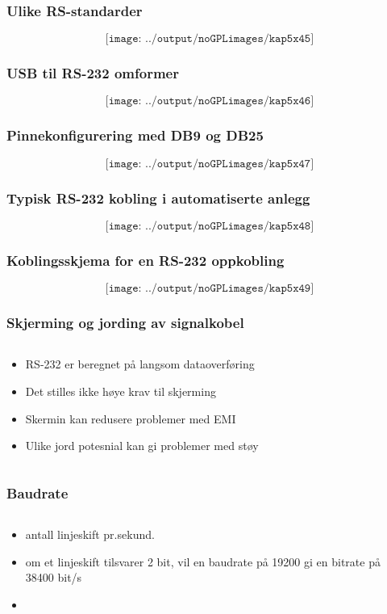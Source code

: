 \documentclass[aspectratio=169,xcolor=dvipsnames]{beamer}
\begin{document}
\begin{frame}
	\frametitle{Ulike RS-standarder}
	$$\texttt{[image: ../output/noGPLimages/kap5x45]}$$
\end{frame}
\begin{frame}
	\frametitle{USB til RS-232 omformer}
	$$\texttt{[image: ../output/noGPLimages/kap5x46]}$$
\end{frame}
\begin{frame}
	\frametitle{Pinnekonfigurering med DB9 og DB25}
	$$\texttt{[image: ../output/noGPLimages/kap5x47]}$$
\end{frame}
\begin{frame}
	\frametitle{Typisk RS-232 kobling i automatiserte anlegg}
	$$\texttt{[image: ../output/noGPLimages/kap5x48]}$$
\end{frame}
\begin{frame}
	\frametitle{Koblingsskjema for en RS-232 oppkobling }
	$$\texttt{[image: ../output/noGPLimages/kap5x49]}$$
\end{frame}
\begin{frame}
	\frametitle{Skjerming og jording av signalkobel}
	\begin{columns}
		\begin{column}{0.5\textwidth}

			\begin{itemize}
				\item RS-232 er beregnet på langsom dataoverføring
				\item Det stilles ikke høye krav til skjerming
				\item Skermin kan redusere problemer med EMI
				\item Ulike jord potesnial kan gi problemer med støy
			\end{itemize}

			
		\end{column}

		\begin{column}{0.5\textwidth}
		\end{column}
	\end{columns}
\end{frame}
\begin{frame}
	\frametitle{Baudrate}
	\begin{columns}
		\begin{column}{0.5\textwidth}

			\begin{itemize}
				\item antall linjeskift pr.sekund. 
				\item om et linjeskift tilsvarer 2 bit, vil en baudrate på 19200 gi en bitrate på 38400 bit/s
				\item 
			\end{itemize}

			
		\end{column}

		\begin{column}{0.5\textwidth}
		\end{column}
	\end{columns}
\end{frame}
\end{document}
